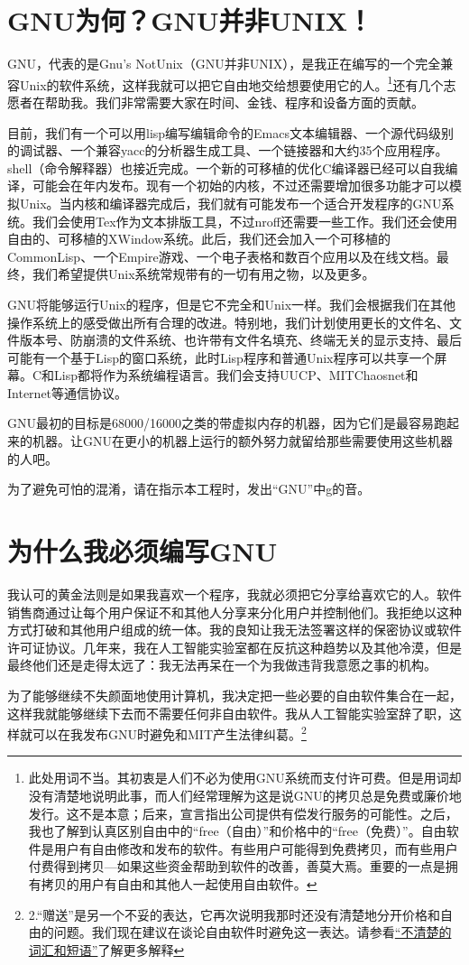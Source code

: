 \documentclass{book}
\begin{document}
\section{GNU为何？GNU并非UNIX！}
GNU，代表的是Gnu's NotUnix（GNU并非UNIX），是我正在编写的一个完全兼容Unix的软件系统，这样我就可以把它自由地交给想要使用它的人。\footnote{此处用词不当。其初衷是人们不必为使用GNU系统而支付许可费。但是用词却没有清楚地说明此事，而人们经常理解为这是说GNU的拷贝总是免费或廉价地发行。这不是本意；后来，宣言指出公司提供有偿发行服务的可能性。之后，我也了解到认真区别自由中的“free（自由）”和价格中的“free（免费）”。自由软件是用户有自由修改和发布的软件。有些用户可能得到免费拷贝，而有些用户付费得到拷贝—如果这些资金帮助到软件的改善，善莫大焉。重要的一点是拥有拷贝的用户有自由和其他人一起使用自由软件。}还有几个志愿者在帮助我。我们非常需要大家在时间、金钱、程序和设备方面的贡献。\par
目前，我们有一个可以用lisp编写编辑命令的Emacs文本编辑器、一个源代码级别的调试器、一个兼容yacc的分析器生成工具、一个链接器和大约35个应用程序。shell（命令解释器）也接近完成。一个新的可移植的优化C编译器已经可以自我编译，可能会在年内发布。现有一个初始的内核，不过还需要增加很多功能才可以模拟Unix。当内核和编译器完成后，我们就有可能发布一个适合开发程序的GNU系统。我们会使用Tex作为文本排版工具，不过nroff还需要一些工作。我们还会使用自由的、可移植的XWindow系统。此后，我们还会加入一个可移植的CommonLisp、一个Empire游戏、一个电子表格和数百个应用以及在线文档。最终，我们希望提供Unix系统常规带有的一切有用之物，以及更多。\par
GNU将能够运行Unix的程序，但是它不完全和Unix一样。我们会根据我们在其他操作系统上的感受做出所有合理的改进。特别地，我们计划使用更长的文件名、文件版本号、防崩溃的文件系统、也许带有文件名填充、终端无关的显示支持、最后可能有一个基于Lisp的窗口系统，此时Lisp程序和普通Unix程序可以共享一个屏幕。C和Lisp都将作为系统编程语言。我们会支持UUCP、MITChaosnet和Internet等通信协议。\par
GNU最初的目标是68000/16000之类的带虚拟内存的机器，因为它们是最容易跑起来的机器。让GNU在更小的机器上运行的额外努力就留给那些需要使用这些机器的人吧。\par
为了避免可怕的混淆，请在指示本工程时，发出“GNU”中g的音。
\section{为什么我必须编写GNU}
我认可的黄金法则是如果我喜欢一个程序，我就必须把它分享给喜欢它的人。软件销售商通过让每个用户保证不和其他人分享来分化用户并控制他们。我拒绝以这种方式打破和其他用户组成的统一体。我的良知让我无法签署这样的保密协议或软件许可证协议。几年来，我在人工智能实验室都在反抗这种趋势以及其他冷漠，但是最终他们还是走得太远了：我无法再呆在一个为我做违背我意愿之事的机构。\par
为了能够继续不失颜面地使用计算机，我决定把一些必要的自由软件集合在一起，这样我就能够继续下去而不需要任何非自由软件。我从人工智能实验室辞了职，这样就可以在我发布GNU时避免和MIT产生法律纠葛。\footnote{2.“赠送”是另一个不妥的表达，它再次说明我那时还没有清楚地分开价格和自由的问题。我们现在建议在谈论自由软件时避免这一表达。请参看\href{http://www.gnu.org/philosophy/words-to-avoid.html\#GiveAwaySoftware}{“不清楚的词汇和短语”}了解更多解释}\par
\end{document}
